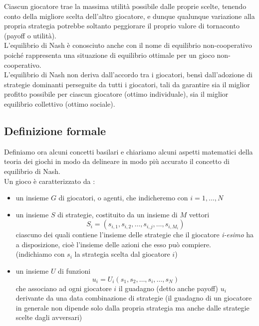 Ciascun giocatore trae la massima utilità possibile dalle proprie scelte, tenendo conto della migliore scelta dell'altro giocatore, e dunque qualunque variazione alla propria strategia potrebbe soltanto peggiorare il proprio valore di tornaconto (payoff o utilità).\\

L'equilibrio di Nash è conosciuto anche con il nome di equilibrio non-cooperativo poiché rappresenta una situazione di equilibrio ottimale per un gioco non-cooperativo.\\

L'equilibrio di Nash non deriva dall'accordo tra i giocatori, bensì dall'adozione di strategie dominanti perseguite da tutti i giocatori, tali da garantire sia il miglior profitto possibile per ciascun giocatore (ottimo individuale), sia il miglior equilibrio collettivo (ottimo sociale).\\

\subsection{Definizione formale}
\justify
Definiamo ora alcuni concetti basilari e chiariamo alcuni aspetti matematici della teoria dei giochi in modo da delineare in modo più accurato il concetto di equilibrio di Nash.\\

Un gioco è caratterizzato da :

\begin{itemize}
	\item un insieme \(G\) di giocatori, o agenti, che indicheremo con \(i = 1,\ldots,N\)
	\item un insieme \(S\) di strategie, costituito da un insieme di \(M\) vettori \[S_{i}=\left(s_{{i,1}},s_{{i,2}},\ldots,s_{{i,j}},\ldots,s_{{i,M_{i}}}\right)\] ciascuno dei quali contiene l'insieme delle strategie che il giocatore \textit{i-esimo} ha a disposizione, cioè l'insieme delle azioni che esso può compiere.\\(indichiamo con \(s_i\) la strategia scelta dal giocatore \(i\))
	\item un insieme \(U\) di funzioni \[u_{i}=U_{i}\left(s_{1},s_{2},\ldots,s_{i},\ldots,s_{N}\right)\] che associano ad ogni giocatore \(i\) il guadagno (detto anche payoff) \(u_i\) derivante da una data combinazione di strategie (il guadagno di un giocatore in generale non dipende solo dalla propria strategia ma anche dalle strategie scelte dagli avversari)
\end{itemize}

